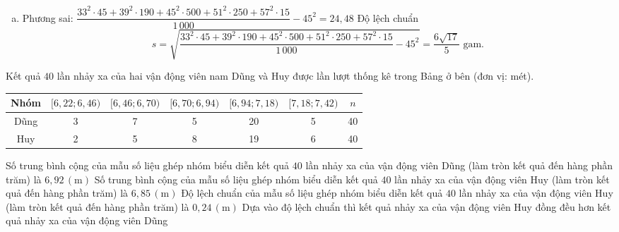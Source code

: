 \begin{ex}
{\begin{enumerate}[a)]
\begin{center}
\begin{tabular}{|l|c|c|c|c|c|}
					      \hline \hline
				      \end{tabular}
			      \end{center}
			      Khối lượng trung bình $$\overline{x}= \dfrac{33 \cdot 45 + 39 \cdot 190 + 45 \cdot 500 + 51 \cdot 250 + 57 \cdot 15}{1\, 000}= 45\text{ gam}.$$
			\item Phương sai: $\dfrac{33^2 \cdot 45 + 39^2 \cdot 190 + 45^2 \cdot 500 + 51^2 \cdot 250 + 57^2 \cdot 15}{1\, 000} - 45^2=24{,}48$
			      Độ lệch chuẩn $$s= \sqrt{\dfrac{33^2 \cdot 45 + 39^2 \cdot 190 + 45^2 \cdot 500 + 51^2 \cdot 250 + 57^2 \cdot 15}{1\, 000} - 45^2} =\dfrac{6\sqrt{17}}{5} \text{ gam}.$$
		\end{enumerate}
	}
\end{ex}
\begin{ex}
	Kết quả $ 40 $ lần nhảy xa của hai vận động viên nam Dũng và Huy được lần lượt thống kê trong Bảng ở bên (đơn vị: mét).
	\begin{center}
		\begin{tabular}{|c|c|c|c|c|c|c|}
			\hline
			Nhóm & $[6,22; 6,46)$ & $[6,46; 6,70)$ & $[6,70; 6,94)$ & $[6,94; 7,18)$ & $[7,18; 7,42)$ & $n$ \\
			\hline
			Dũng & 3              & 7              & 5              & 20             & 5              & 40  \\
			\hline
			Huy  & 2              & 5              & 8              & 19             & 6              & 40  \\
			\hline
		\end{tabular}
	\end{center}
	\choiceTF
	{\True Số trung bình cộng của mẫu số liệu ghép nhóm biểu diễn kết quả $ 40 $ lần nhảy xa của vận động viên Dũng (làm tròn kết quả đến hàng phần trăm) là $6,92\,(\mathrm{m})$}
	{Số trung bình cộng của mẫu số liệu ghép nhóm biểu diễn kết quả $ 40 $ lần nhảy xa của vận động viên Huy (làm tròn kết quả đến hàng phần trăm) là $6,85\,(\mathrm{m})$}
	{\True Độ lệch chuẩn của mẫu số liệu ghép nhóm biểu diễn kết quả $ 40 $ lần nhảy xa của vận động viên Huy (làm tròn kết quả đến hàng phần trăm) là $0,24\,(\mathrm{m})$}
	{\True Dựa vào độ lệch chuẩn thì kết quả nhảy xa của vận động viên Huy đồng đều hơn kết quả nhảy xa của vận động viên Dũng}


\end{ex}
